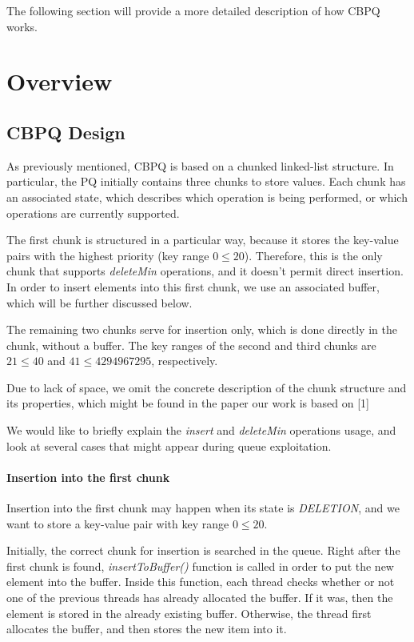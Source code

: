 \documentclass{article}
\begin{document}
The following section will provide a more detailed description of how CBPQ works.

\section{Overview}
\subsection{CBPQ Design}

As previously mentioned, CBPQ is based on a chunked linked-list structure. In particular, the PQ initially contains three chunks to store values. Each chunk has an associated state, which describes which operation is being performed, or which operations are currently supported.\par

The first chunk is structured in a particular way, because it stores the key-value pairs with the highest priority (key range $0 \leqslant 20$). Therefore, this is the only chunk that supports \textit{deleteMin} operations, and it doesn't permit direct insertion. In order to insert elements into this first chunk, we use an associated buffer, which will be further discussed below.\par

The remaining two chunks serve for insertion only, which is done directly in the chunk, without a buffer. The key ranges of the second and third chunks are $21 \leqslant 40$ and $41 \leqslant 4294967295$, respectively.\par
Due to lack of space, we omit the concrete description of the chunk structure and its properties, which might be found in the paper our work is based on [1]\par

We would like to briefly explain the \textit{insert} and \textit{deleteMin} operations usage, and look at several cases that might appear during queue exploitation.

\paragraph{Insertion into the first chunk}\mbox{}\par

Insertion into the first chunk may happen when its state is \emph{DELETION}, and we want to store a key-value pair with key range $0 \leqslant 20$.\par

Initially, the correct chunk for insertion is searched in the queue. Right after the first chunk is found, \textit{insertToBuffer()} function is called in order to put the new element into the buffer. Inside this function, each thread checks whether or not one of the previous threads has already allocated the buffer. If it was, then the element is stored in the already existing buffer. Otherwise, the thread first allocates the buffer, and then stores the new item into it.\par
\end{document}
